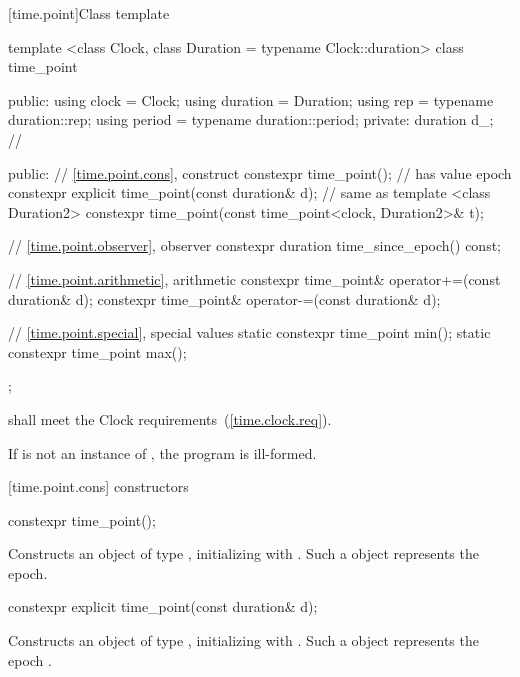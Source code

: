 [time.point]{Class template }

%
\begin{codeblock}
template <class Clock, class Duration = typename Clock::duration>
class time_point {
public:
  using clock    = Clock;
  using duration = Duration;
  using rep      = typename duration::rep;
  using period   = typename duration::period;
private:
  duration d_;  // \expos

public:
  // \ref{time.point.cons}, construct
  constexpr time_point();  // has value epoch
  constexpr explicit time_point(const duration& d);  // same as 
  template <class Duration2>
    constexpr time_point(const time_point<clock, Duration2>& t);

  // \ref{time.point.observer}, observer
  constexpr duration time_since_epoch() const;

  // \ref{time.point.arithmetic}, arithmetic
  constexpr time_point& operator+=(const duration& d);
  constexpr time_point& operator-=(const duration& d);

  // \ref{time.point.special}, special values
  static constexpr time_point min();
  static constexpr time_point max();
};
\end{codeblock}

\pnum
{} shall meet the Clock requirements~(\ref{time.clock.req}).

\pnum
If  is not an instance of ,
the program is ill-formed.

[time.point.cons]{ constructors}

%
\begin{itemdecl}
constexpr time_point();
\end{itemdecl}

\begin{itemdescr}
\pnum
\effects Constructs an object of type , initializing
 with . Such a  object
represents the epoch.
\end{itemdescr}

%
\begin{itemdecl}
constexpr explicit time_point(const duration& d);
\end{itemdecl}

\begin{itemdescr}
\pnum
\effects Constructs an object of type , initializing
 with . Such a  object represents the epoch
.
\end{itemdescr}


